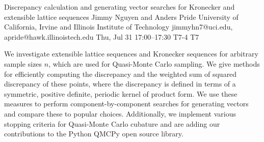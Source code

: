 \documentclass[12pt,lettersize,oneside]{book} %
\begin{document}
\begin{talk}
  {Discrepancy calculation and generating vector searches for Kronecker and extensible lattice sequences}%
  {Jimmy Nguyen and Anders Pride}%
  {University of California, Irvine and Illinois Institute of Technology}%
  {jimmyhn7@uci.edu, apride@hawk.illinoistech.edu}%
  {}%
  {}%
  {Thu, Jul 31 17:00--17:30}%
  {T7-4}%
  {T7}%
  {}%
  {}%
  {}%
  {}%
  {}%

We investigate extensible lattice sequences and Kronecker sequences for arbitrary sample sizes $n$, which are used for Quasi-Monte Carlo sampling. We give methods for efficiently computing the discrepancy and the weighted sum of squared discrepancy of these points, where the discrepancy is defined in terms of a symmetric, positive definite, periodic kernel of product form. We use these measures to perform component-by-component searches for generating vectors and compare these to popular choices. Additionally, we implement various stopping criteria for Quasi-Monte Carlo cubature and are adding our contributions to the Python QMCPy open source library.



\end{talk}
\end{document}
